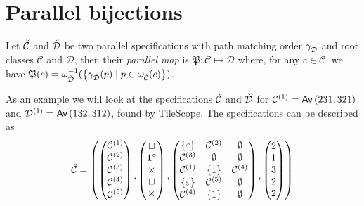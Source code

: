 \section{Parallel bijections}
\begin{definition}
Let $\check{\mathcal{C}}$ and $\check{\mathcal{D}}$ be two parallel specifications with path matching order $\gamma_{\check{\mathcal{D}}}$ and root classes $\mathcal{C}$ and $\mathcal{D}$, then their \emph{parallel map} is
$\mathfrak{P}: \mathcal{C} \mapsto \mathcal{D}$ where, for any $c \in \mathcal{C}$, we have
$\mathfrak{P}(c) = \omega_{\check{\mathcal{D}}}^{-1}(\left\{\gamma_{\check{\mathcal{D}}}(p) \mid p \in \omega_{\check{\mathcal{C}}}(c)\right\})$.
\end{definition}

As an example we will look at the specifications $\check{\mathcal{C}}$ and $\check{\mathcal{D}}$ for $\mathcal{C}^{(1)} = \textsf{Av}\left(231,321\right)$ and $\mathcal{D}^{(1)} = \textsf{Av}\left(132,312\right)$, found by TileScope. The specifications can be described as
\[
    \check{\mathcal{C}} = \left(
    \begin{pmatrix}
        \mathcal{C}^{(1)}\\\mathcal{C}^{(2)}\\\mathcal{C}^{(3)}\\\mathcal{C}^{(4)}\\\mathcal{C}^{(5)}    
    \end{pmatrix}
    \begin{matrix}\\,\end{matrix}
    \begin{pmatrix}
        \sqcup\\
        \mathbf{1}^\circ\\
        \times\\
        \sqcup\\
        \times
    \end{pmatrix}
    \begin{matrix}\\,\end{matrix}
    \begin{pmatrix}
        \left\{\varepsilon\right\} & \mathcal{C}^{(2)} & \emptyset\\
        \mathcal{C}^{(3)} & \emptyset & \emptyset\\
        \mathcal{C}^{(1)} & \left\{1\right\} & \mathcal{C}^{(4)}\\
        \left\{\varepsilon\right\} & \mathcal{C}^{(5)}  & \emptyset\\
        \mathcal{C}^{(4)} & \left\{1\right\} & \emptyset
    \end{pmatrix}
    \begin{matrix}\\,\end{matrix}
    \begin{pmatrix}
        2\\1\\3\\2\\2
    \end{pmatrix}
    \right)
\]
